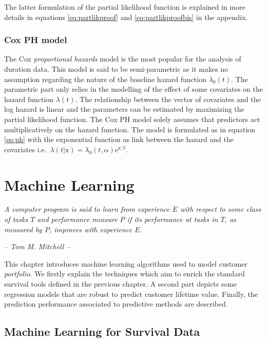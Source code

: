 \documentclass[
]{book}
\begin{document}
The latter formulation of the partial likelihood function is explained in more details in equations \eqref{eq:partlikproof} and \eqref{eq:partlikproofbis} in the appendix.

\hypertarget{cox-ph-model}{%
\subsection{Cox PH model}\label{cox-ph-model}}

The Cox \emph{proportional hazards} model is the most popular for the analysis of duration data. This model is said to be semi-parametric as it makes no assumption regarding the nature of the baseline hazard function \(\lambda_0(t)\). The parametric part only relies in the modelling of the effect of some covariates on the hazard function \(\lambda(t)\). The relationship between the vector of covariates and the log hazard is linear and the parameters can be estimated by maximizing the partial likelihood function. The Cox PH model solely assumes that predictors act multiplicatively on the hazard function. The model is formulated as in equation \eqref{eq:ph} with the exponential function as link between the hazard and the covariates i.e.~\(\lambda(t|\pmb{\mathrm{x}}) = \lambda_0 (t,\alpha) \text{e}^{\pmb{\mathrm{x'}} \beta}\).

\hypertarget{ml}{%
\chapter{Machine Learning}\label{ml}}

\emph{A computer program is said to learn from experience \(E\) with respect to some class of tasks \(T\) and performance measure \(P\) if its performance at tasks in \(T\), as measured by \(P\), improves with experience \(E\).}

\emph{-- Tom M. Mitchell --}

This chapter introduces machine learning algorithms used to model customer \emph{portfolio}. We firstly explain the techniques which aim to enrich the standard survival tools defined in the previous chapter. A second part depicts some regression models that are robust to predict customer lifetime value. Finally, the prediction performance associated to predictive methods are described.

\hypertarget{machine-learning-for-survival-data}{%
\section{Machine Learning for Survival Data}\label{machine-learning-for-survival-data}}
\end{document}
